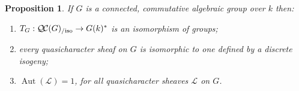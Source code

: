 \documentclass[CM,Submssn,SecEq]{degruyter-crelle} %
\theoremstyle{plain}
\newtheorem{proposition}[theorem]{Proposition}
\theoremstyle{definition}
\theoremstyle{remark}
\newcommand{\Fq}{k}
\DeclareMathOperator{\Aut}{Aut}
\DeclareMathOperator{\Hom}{Hom}
\newcommand{\TrFrob}[1]{T_{#1}}
\newcommand{\qcs}[1]{{\mathcal{#1}}}
\newcommand{\QC}{{\mathcal{Q\hskip-0.8pt C}}}
\newcommand{\QCiso}[1]{\QC(#1)_{/\text{iso}}}
\begin{document}
\begin{proposition}\label{prop:connected}
 If $G$ is a connected, commutative algebraic group over $\Fq$ then:
 \begin{enumerate}
 \item $\TrFrob{G} : \QCiso{G} \to G(\Fq)^*$ is an isomorphism of groups;
 \item every quasicharacter sheaf on $G$ is isomorphic to one defined by a discrete isogeny;%
 \item $\Aut(\qcs{L}) = 1$, for all quasicharacter sheaves $\qcs{L}$ on $G$.
 \end{enumerate}
 \end{proposition}
\end{document}
